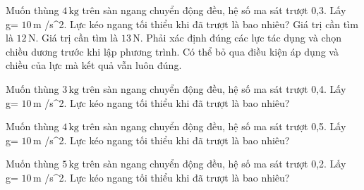 \begin{ex}
Muốn thùng $4\,\text{kg}$ trên sàn ngang chuyển động đều, hệ số ma sát trượt 0,3. Lấy g= $10\,\text{m}$ /s^2. Lực kéo ngang tối thiểu khi đã trượt là bao nhiêu?
\choiceTF
{\True Giá trị cần tìm là $12\,\text{N}$.}
{Giá trị cần tìm là $13\,\text{N}$.}
{\True Phải xác định đúng các lực tác dụng và chọn chiều dương trước khi lập phương trình.}
{Có thể bỏ qua điều kiện áp dụng và chiều của lực mà kết quả vẫn luôn đúng.}
\end{ex}

\begin{ex}
Muốn thùng $3\,\text{kg}$ trên sàn ngang chuyển động đều, hệ số ma sát trượt 0,4. Lấy g= $10\,\text{m}$ /s^2. Lực kéo ngang tối thiểu khi đã trượt là bao nhiêu?
\end{ex}

\begin{ex}
Muốn thùng $4\,\text{kg}$ trên sàn ngang chuyển động đều, hệ số ma sát trượt 0,5. Lấy g= $10\,\text{m}$ /s^2. Lực kéo ngang tối thiểu khi đã trượt là bao nhiêu?
\end{ex}

\begin{ex}
Muốn thùng $5\,\text{kg}$ trên sàn ngang chuyển động đều, hệ số ma sát trượt 0,2. Lấy g= $10\,\text{m}$ /s^2. Lực kéo ngang tối thiểu khi đã trượt là bao nhiêu?
\end{ex}

